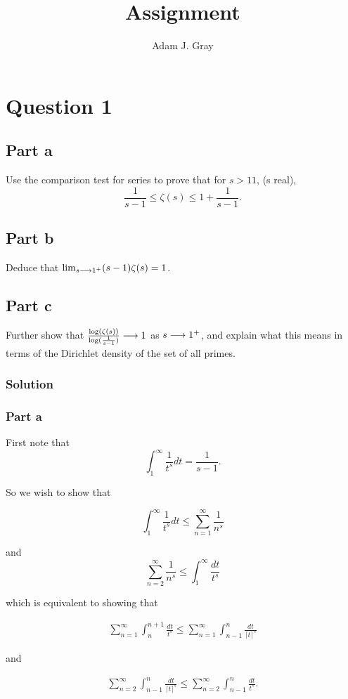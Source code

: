 \documentclass{unswmaths}
\begin{document}
\author{Adam J. Gray}
\subject{Number Theory}
\title{Assignment}

\unswtitle

\section*{Question 1}
\subsection*{Part a}
Use the comparison test for series to prove that for  $ s > 11 $, (s real),
$$
	\frac{1}{s-1} \leq \zeta(s) \leq 1 + \frac{1}{s-1}.
$$
\subsection*{Part b}
Deduce that $ \lim_{s \longrightarrow 1^+} (s-1)\zeta(s) = 1 $.
\subsection*{Part c}
Further show that $ \frac{\log(\zeta(s))}{\log(\frac{1}{s-1})} \longrightarrow 1 $ as $ s \longrightarrow 1^+ $, and explain what this means in terms of 
the Dirichlet density of the set of all primes.

\subsubsection*{Solution}

\subsubsection*{Part a}

First note that
$$
	\int_1^\infty \frac{1}{t^s} dt = \frac{1}{s-1}.
$$

So we wish to show that 

$$
	\int_1^\infty \frac{1}{t^s} dt \leq \sum_{n=1}^\infty \frac{1}{n^s}
$$

and
$$
	\sum_{n=2}^\infty \frac{1}{n^s} \leq \int_1^\infty \frac{dt}{t^s} 
$$

which is equivalent to showing that

\begin{align}
	\label{ineq-1}
	\sum_{n=1}^\infty \int_{n}^{n+1} \frac{dt}{t^s} \leq \sum_{n=1}^\infty \int_{n-1}^{n} \frac{dt}{\lceil t \rceil^s}
\end{align}

and

\begin{align}
	\label{ineq-2}
	\sum_{n=2}^\infty \int_{n-1}^{n} \frac{dt}{\lceil t \rceil^s} \leq \sum_{n=2}^\infty \int_{n-1}^n \frac{dt}{t^s}.
\end{align}
\end{document}
